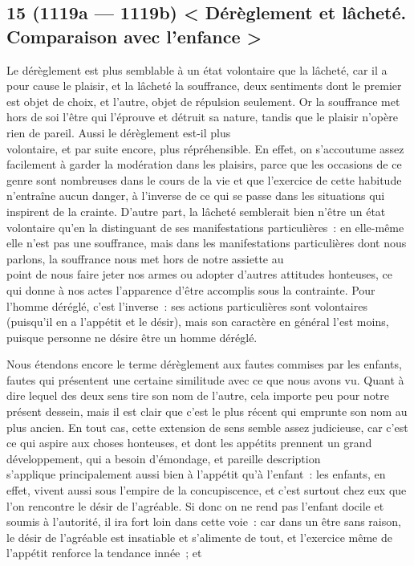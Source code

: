 \documentclass[french,twoside]{book} %
\begin{document}
\subsection[{15 (1119a — 1119b) < Dérèglement et lâcheté. Comparaison avec l’enfance >}]{15 (1119a — 1119b) < Dérèglement et lâcheté. Comparaison avec l’enfance >}
\noindent Le dérèglement est plus semblable à un état volontaire que la lâcheté, car il a pour cause le plaisir, et la lâcheté la souffrance, deux sentiments dont le premier est objet de choix, et l’autre, objet de répulsion seulement. Or la souffrance met hors de soi l’être qui l’éprouve et détruit sa nature, tandis que le plaisir n’opère rien de pareil. Aussi le dérèglement est-il plus \\
volontaire, et par suite encore, plus répréhensible. En effet, on s’accoutume assez facilement à garder la modération dans les plaisirs, parce que les occasions de ce genre sont nombreuses dans le cours de la vie et que l’exercice de cette habitude n’entraîne aucun danger, à l’inverse de ce qui se passe dans les situations qui inspirent de la crainte. D’autre part, la lâcheté semblerait bien n’être un état volontaire qu’en la distinguant de ses manifestations particulières : en elle-même elle n’est pas une souffrance, mais dans les manifestations particulières dont nous parlons, la souffrance nous met hors de notre assiette au \\
point de nous faire jeter nos armes ou adopter d’autres attitudes honteuses, ce qui donne à nos actes l’apparence d’être accomplis sous la contrainte. Pour l’homme déréglé, c’est l’inverse : ses actions particulières sont volontaires (puisqu’il en a l’appétit et le désir), mais son caractère en général l’est moins, puisque personne ne désire être un homme déréglé.\par
Nous étendons encore le terme dérèglement aux fautes commises par les enfants, fautes qui présentent une certaine  similitude avec ce que nous avons vu. Quant à dire lequel des deux sens tire son nom de l’autre, cela importe peu pour notre présent dessein, mais il est clair que c’est le plus récent qui emprunte son nom au plus ancien. En tout cas, cette extension de sens semble assez judicieuse, car c’est ce qui aspire aux choses honteuses, et dont les appétits prennent un grand développement, qui a besoin d’émondage, et pareille description \\
s’applique principalement aussi bien à l’appétit qu’à l’enfant : les enfants, en effet, vivent aussi sous l’empire de la concupiscence, et c’est surtout chez eux que l’on rencontre le désir de l’agréable. Si donc on ne rend pas l’enfant docile et soumis à l’autorité, il ira fort loin dans cette voie : car dans un être sans raison, le désir de l’agréable est insatiable et s’alimente de tout, et l’exercice même de l’appétit renforce la tendance innée ; et \\
\end{document}
